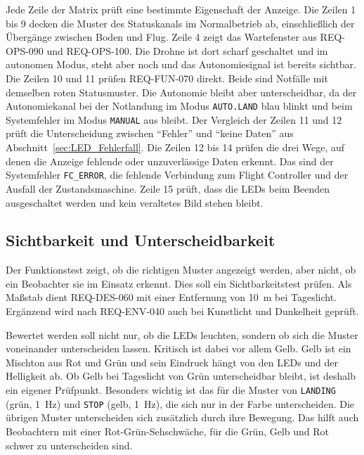         Jede Zeile der Matrix prüft eine bestimmte Eigenschaft der Anzeige. Die Zeilen 1 bis 9 decken die Muster des Statuskanals im Normalbetrieb ab, einschließlich der Übergänge zwischen Boden und Flug. Zeile 4 zeigt das Wartefenster aus REQ-OPS-090 und REQ-OPS-100. Die Drohne ist dort scharf geschaltet und im autonomen Modus, steht aber noch und das Autonomiesignal ist bereits sichtbar. Die Zeilen 10 und 11 prüfen REQ-FUN-070 direkt. Beide sind Notfälle mit demselben roten Statusmuster. Die Autonomie bleibt aber unterscheidbar, da der Autonomiekanal bei der Notlandung im Modus \texttt{AUTO.LAND} blau blinkt und beim Systemfehler im Modus \texttt{MANUAL} aus bleibt. Der Vergleich der Zeilen 11 und 12 prüft die Unterscheidung zwischen \enquote{Fehler} und \enquote{keine Daten} aus Abschnitt~\ref{sec:LED_Fehlerfall}. Die Zeilen 12 bis 14 prüfen die drei Wege, auf denen die Anzeige fehlende oder unzuverlässige Daten erkennt. Das sind der Systemfehler \texttt{FC\_ERROR}, die fehlende Verbindung zum Flight Controller und der Ausfall der Zustandsmaschine. Zeile 15 prüft, dass die LEDs beim Beenden ausgeschaltet werden und kein veraltetes Bild stehen bleibt.

        \subsection{Sichtbarkeit und Unterscheidbarkeit}
        \label{sec:Eval_LED_Sicht}

        Der Funktionstest zeigt, ob die richtigen Muster angezeigt werden, aber nicht, ob ein Beobachter sie im Einsatz erkennt. Dies soll ein Sichtbarkeitstest prüfen. Als Maßstab dient REQ-DES-060 mit einer Entfernung von \SI{10}{\metre} bei Tageslicht. Ergänzend wird nach REQ-ENV-040 auch bei Kunstlicht und Dunkelheit geprüft.

        Bewertet werden soll nicht nur, ob die LEDs leuchten, sondern ob sich die Muster voneinander unterscheiden lassen. Kritisch ist dabei vor allem Gelb. Gelb ist ein Mischton aus Rot und Grün und sein Eindruck hängt von den LEDs und der Helligkeit ab. Ob Gelb bei Tageslicht von Grün unterscheidbar bleibt, ist deshalb ein eigener Prüfpunkt. Besonders wichtig ist das für die Muster von \texttt{LANDING} (grün, \SI{1}{\hertz}) und \texttt{STOP} (gelb, \SI{1}{\hertz}), die sich nur in der Farbe unterscheiden. Die übrigen Muster unterscheiden sich zusätzlich durch ihre Bewegung. Das hilft auch Beobachtern mit einer Rot-Grün-Sehschwäche, für die Grün, Gelb und Rot schwer zu unterscheiden sind.

